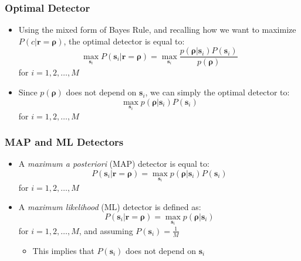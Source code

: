 \documentclass[10pt]{beamer}
\begin{document}
\frame
{
  \frametitle{Optimal Detector}
  
  \begin{itemize}
    \item Using the mixed form of Bayes Rule, and recalling how we want to maximize $P(c|\mathbf{r}=\mathbf{\rho})$, the optimal detector is equal to:
    \begin{equation}
        \max\limits_{\mathbf{s}_i}P(\mathbf{s}_i|\mathbf{r}=\mathbf{\rho})=\max\limits_{\mathbf{s}_i}\frac{p(\mathbf{\rho}|\mathbf{s}_i)P(\mathbf{s}_i)}{p(\mathbf{\rho})}
    \end{equation}
    for $i=1,2,\ldots,M$
    \item Since $p(\mathbf{\rho})$ does not depend on $\mathbf{s}_i$, we can simply the optimal detector to:
    \begin{equation}
        \max\limits_{\mathbf{s}_i}{p(\mathbf{\rho}|\mathbf{s}_i)P(\mathbf{s}_i)}
    \end{equation}
    for $i=1,2,\ldots,M$    
  \end{itemize}
    
}
\frame
{
  \frametitle{MAP and ML Detectors}

  \begin{itemize}
    \item A {\it maximum a posteriori} (MAP) detector is equal to:
    \begin{equation}
        P(\mathbf{s}_i|\mathbf{r}=\mathbf{\rho})=\max\limits_{\mathbf{s}_i}{p(\mathbf{\rho}|\mathbf{s}_i)P(\mathbf{s}_i)}
    \end{equation}
    for $i=1,2,\ldots,M$    \item A {\it maximum likelihood} (ML) detector is defined as:
    \begin{equation}
        P(\mathbf{s}_i|\mathbf{r}=\mathbf{\rho})=\max\limits_{\mathbf{s}_i}{p(\mathbf{\rho}|\mathbf{s}_i)}
    \end{equation}
    for $i=1,2,\ldots,M$, and assuming $P(\mathbf{s}_i)=\frac{1}{M}$
    \begin{itemize}
        \item This implies that $P(\mathbf{s}_i)$ does not depend on $\mathbf{s}_i$
    \end{itemize}
  \end{itemize}

}
\end{document}
